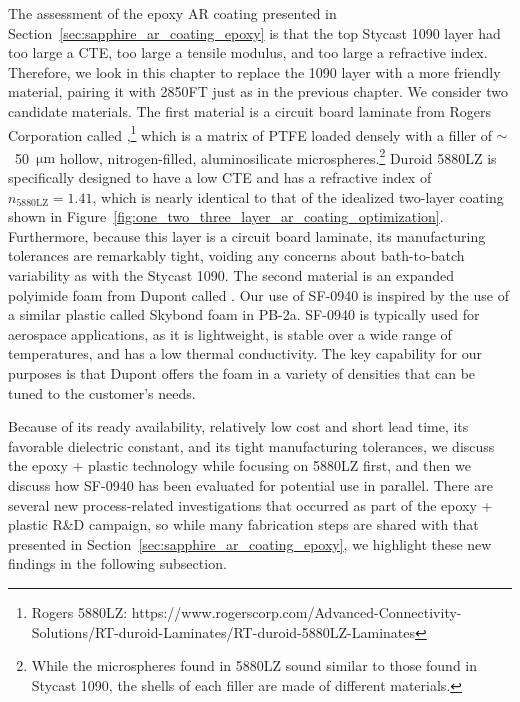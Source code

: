 The assessment of the epoxy AR coating presented in Section~\ref{sec:sapphire_ar_coating_epoxy} is that the top Stycast 1090 layer had too large a CTE, too large a tensile modulus, and too large a refractive index. Therefore, we look in this chapter to replace the 1090 layer with a more friendly material, pairing it with 2850FT just as in the previous chapter. We consider two candidate materials. The first material is a circuit board laminate from Rogers Corporation called ,\footnote{Rogers 5880LZ: https://www.rogerscorp.com/Advanced-Connectivity-Solutions/RT-duroid-Laminates/RT-duroid-5880LZ-Laminates} which is a matrix of PTFE loaded densely with a filler of $\sim$~50~$\mathrm{\mu m}$ hollow, nitrogen-filled, aluminosilicate microspheres.\footnote{While the microspheres found in 5880LZ sound similar to those found in Stycast 1090, the shells of each filler are made of different materials.} Duroid 5880LZ is specifically designed to have a low CTE and has a refractive index of $n_{\mathrm{5880LZ}} = 1.41$, which is nearly identical to that of the idealized two-layer coating shown in Figure~\ref{fig:one_two_three_layer_ar_coating_optimization}. Furthermore, because this layer is a circuit board laminate, its manufacturing tolerances are remarkably tight, voiding any concerns about bath-to-batch variability as with the Stycast 1090. The second material is an expanded polyimide foam from Dupont called . Our use of SF-0940 is inspired by the use of a similar plastic called Skybond foam in PB-2a. SF-0940 is typically used for aerospace applications, as it is lightweight, is stable over a wide range of temperatures, and has a low thermal conductivity. The key capability for our purposes is that Dupont offers the foam in a variety of densities that can be tuned to the customer's needs.

Because of its ready availability, relatively low cost and short lead time, its favorable dielectric constant, and its tight manufacturing tolerances, we discuss the epoxy + plastic technology while focusing on 5880LZ first, and then we discuss how SF-0940 has been evaluated for potential use in parallel. There are several new process-related investigations that occurred as part of the epoxy + plastic R\&D campaign, so while many fabrication steps are shared with that presented in Section~\ref{sec:sapphire_ar_coating_epoxy}, we highlight these new findings in the following subsection. 


